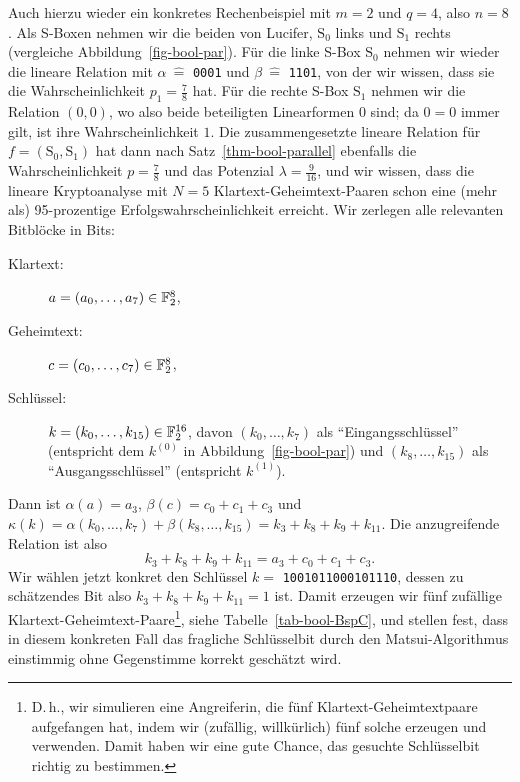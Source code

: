 \begin{refsegment}
Auch hierzu wieder ein konkretes Rechenbeispiel mit $m = 2$ und $q = 4$,
also $n = 8$. Als S-Boxen nehmen wir die beiden von {\sc Lucifer}, $\textrm{S}_0$
links und $\textrm{S}_1$ rechts (vergleiche Abbildung~\ref{fig-bool-par}).
Für die linke S-Box $\textrm{S}_0$ nehmen wir wieder die lineare Relation
mit $\alpha \:\hat{=}$ \verb:0001: und $\beta \:\hat{=}$ \verb:1101:,
von der wir wissen, dass sie die
Wahrscheinlichkeit $p_1 = \frac{7}{8}$ hat. Für die rechte S-Box $\textrm{S}_1$
nehmen wir die Relation $(0,0)$, wo also beide beteiligten Linearformen $0$ sind;
da $0 = 0$ immer gilt, ist ihre Wahrscheinlichkeit $1$. Die zusammengesetzte lineare
Relation für $f = (\textrm{S}_0,\textrm{S}_1)$ hat dann nach Satz~\ref{thm-bool-parallel}
ebenfalls die
Wahrscheinlichkeit $p = \frac{7}{8}$ und das Potenzial $\lambda = \frac{9}{16}$,
und wir wissen, dass die lineare Kryptoanalyse mit $N = 5$ Klartext-Geheimtext-Paaren
schon eine (mehr als) 95-prozentige Erfolgswahrscheinlichkeit erreicht. Wir zerlegen
alle relevanten Bitblöcke in Bits:
\begin{description}
   \item[Klartext:] $a = (a_0, \ldots, a_7) \in \mathbb{F}_2^8$,
   \item[Geheimtext:] $c = (c_0, \ldots, c_7) \in \mathbb{F}_2^8$,
   \item[Schlüssel:] $k = (k_0, \ldots, k_{15}) \in \mathbb{F}_2^{16}$, davon
      $(k_0, \ldots, k_7)$ als "`Eingangsschlüssel"' (entspricht dem
      $k^{(0)}$ in Abbildung~\ref{fig-bool-par}) und $(k_8, \ldots, k_{15})$
      als "`Ausgangsschlüssel"' (entspricht $k^{(1)}$).
\end{description}
Dann ist $\alpha(a) = a_3$, $\beta(c) = c_0 + c_1 + c_3$ und
$\kappa(k) = \alpha(k_0, \ldots, k_7) + \beta(k_8, \ldots, k_{15}) = k_3 + k_8 + k_9 + k_{11}$.
Die anzugreifende Relation ist also
\[
     k_3 + k_8 + k_9 + k_{11} = a_3 + c_0 + c_1 + c_3.
\]
Wir wählen jetzt konkret den Schlüssel $k =$ \verb:1001011000101110:, dessen zu
schätzendes Bit also $k_3 + k_8 + k_9 + k_{11} = 1$ ist. Damit erzeugen wir
fünf zufällige Klartext-Geheimtext-Paare\footnote{%
   D.\,h., wir simulieren eine Angreiferin, die fünf Klartext-Geheimtextpaare
   aufgefangen hat, indem wir (zufällig, willkürlich) fünf solche erzeugen und
   verwenden. Damit haben wir eine gute Chance, das gesuchte Schlüsselbit richtig
   zu bestimmen.
}, siehe Tabelle~\ref{tab-bool-BspC},
und stellen fest, dass in diesem konkreten Fall das fragliche Schlüsselbit
durch den Matsui-Algorithmus einstimmig ohne Gegenstimme korrekt geschätzt wird.


\end{refsegment}
